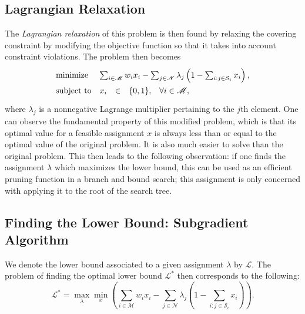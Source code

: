 \documentclass[journal]{IEEEtran}
\begin{document}
\subsection{Lagrangian Relaxation}
The \emph{Lagrangian relaxation} of this problem is then found by relaxing the covering constraint by modifying the objective function so that it takes into account constraint violations.
The problem then becomes
\[
\renewcommand{\arraystretch}{1.5}
\begin{array}{lrcl@{\quad}l}
\textnormal{minimize} & \multicolumn{4}{l}{\sum_{i \in \mathscr{M}} w_i x_i - \sum_{j \in \mathscr{N}} \lambda_j \left(1 - \sum_{i : j \in \mathcal{S}_i} x_i \right),}\\
\textnormal{subject to} & x_i &\in& \{0, 1\}, & \forall i \in \mathscr{M},
\end{array}
\]
where \(\lambda_j\) is a nonnegative Lagrange multiplier pertaining to the \(j\)th element.
One can observe the fundamental property of this modified problem, which is that its optimal value for a feasible assignment \(x\) is always less than or equal to the optimal value of the original problem.
It is also much easier to solve than the original problem.
This then leads to the following observation: if one finds the assignment \(\lambda\) which maximizes the lower bound, this can be used as an efficient pruning function in a branch and bound search; this assignment is only concerned with applying it to the root of the search tree.

\subsection{Finding the Lower Bound: Subgradient Algorithm}
We denote the lower bound associated to a given assignment \(\lambda\) by \(\mathscr{L}\).
The problem of finding the optimal lower bound \(\mathscr{L}^*\) then corresponds to the following:
\[
\mathscr{L}^* = \max_\lambda \min_{x} \left(\sum_{i \in \mathscr{M}} w_i x_i - \sum_{j \in \mathscr{N}} \lambda_j \left(1 - \sum_{i : j \in \mathcal{S}_i} x_i \right)\right).
\]
\end{document}
